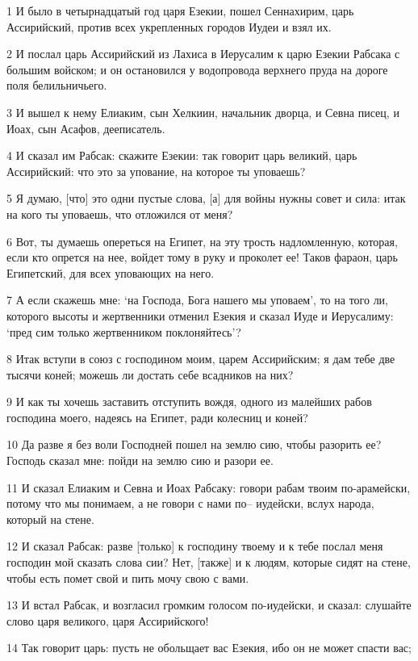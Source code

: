 \par 1 И было в четырнадцатый год царя Езекии, пошел Сеннахирим, царь Ассирийский, против всех укрепленных городов Иудеи и взял их.
\par 2 И послал царь Ассирийский из Лахиса в Иерусалим к царю Езекии Рабсака с большим войском; и он остановился у водопровода верхнего пруда на дороге поля белильничьего.
\par 3 И вышел к нему Елиаким, сын Хелкиин, начальник дворца, и Севна писец, и Иоах, сын Асафов, дееписатель.
\par 4 И сказал им Рабсак: скажите Езекии: так говорит царь великий, царь Ассирийский: что это за упование, на которое ты уповаешь?
\par 5 Я думаю, [что] это одни пустые слова, [а] для войны нужны совет и сила: итак на кого ты уповаешь, что отложился от меня?
\par 6 Вот, ты думаешь опереться на Египет, на эту трость надломленную, которая, если кто опрется на нее, войдет тому в руку и проколет ее! Таков фараон, царь Египетский, для всех уповающих на него.
\par 7 А если скажешь мне: `на Господа, Бога нашего мы уповаем', то на того ли, которого высоты и жертвенники отменил Езекия и сказал Иуде и Иерусалиму: `пред сим только жертвенником поклоняйтесь'?
\par 8 Итак вступи в союз с господином моим, царем Ассирийским; я дам тебе две тысячи коней; можешь ли достать себе всадников на них?
\par 9 И как ты хочешь заставить отступить вождя, одного из малейших рабов господина моего, надеясь на Египет, ради колесниц и коней?
\par 10 Да разве я без воли Господней пошел на землю сию, чтобы разорить ее? Господь сказал мне: пойди на землю сию и разори ее.
\par 11 И сказал Елиаким и Севна и Иоах Рабсаку: говори рабам твоим по-арамейски, потому что мы понимаем, а не говори с нами по-- иудейски, вслух народа, который на стене.
\par 12 И сказал Рабсак: разве [только] к господину твоему и к тебе послал меня господин мой сказать слова сии? Нет, [также] и к людям, которые сидят на стене, чтобы есть помет свой и пить мочу свою с вами.
\par 13 И встал Рабсак, и возгласил громким голосом по-иудейски, и сказал: слушайте слово царя великого, царя Ассирийского!
\par 14 Так говорит царь: пусть не обольщает вас Езекия, ибо он не может спасти вас;
